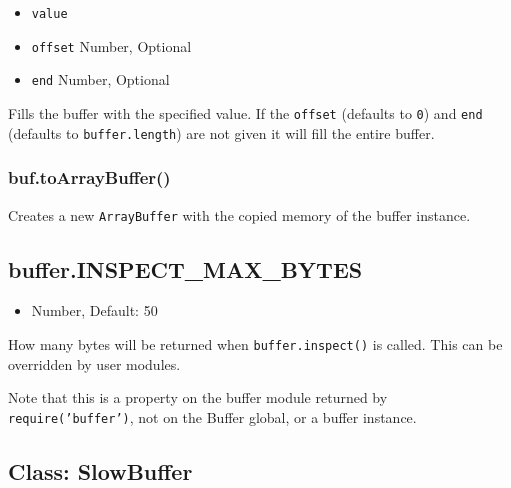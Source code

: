 \begin{itemize}
\itemsep1pt\parskip0pt
\item
  \texttt{value}
\item
  \texttt{offset} Number, Optional
\item
  \texttt{end} Number, Optional
\end{itemize}

Fills the buffer with the specified value. If the \texttt{offset}
(defaults to \texttt{0}) and \texttt{end} (defaults to
\texttt{buffer.length}) are not given it will fill the entire buffer.

\begin{Shaded}
\begin{Highlighting}[]
  \NormalTok{(}\NormalTok{);}
\NormalTok{(}\NormalTok{);}
\end{Highlighting}
\end{Shaded}

\subsubsection{buf.toArrayBuffer()}\label{buf.toarraybuffer}

Creates a new \texttt{ArrayBuffer} with the copied memory of the buffer
instance.

\subsection{buffer.INSPECT\_MAX\_BYTES}\label{buffer.inspectux5fmaxux5fbytes}

\begin{itemize}
\itemsep1pt\parskip0pt
\item
  Number, Default: 50
\end{itemize}

How many bytes will be returned when \texttt{buffer.inspect()} is
called. This can be overridden by user modules.

Note that this is a property on the buffer module returned by
\texttt{require('buffer')}, not on the Buffer global, or a buffer
instance.

\subsection{Class: SlowBuffer}\label{class-slowbuffer}

